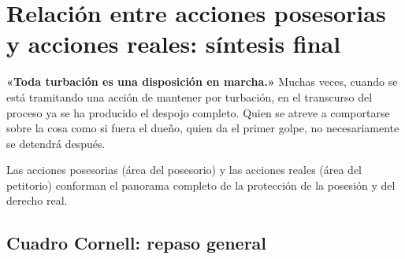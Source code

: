 \documentclass[12pt,oneside]{book}
\begin{document}
\chapter{Relación entre acciones posesorias y acciones reales: síntesis final}

\begin{important}
\textbf{«Toda turbación es una disposición en marcha.»} Muchas veces, cuando se está tramitando una acción de mantener por turbación, en el transcurso del proceso ya se ha producido el despojo completo. Quien se atreve a comportarse sobre la cosa como si fuera el dueño, quien da el primer golpe, no necesariamente se detendrá después.
\end{important}

Las acciones posesorias (área del posesorio) y las acciones reales (área del petitorio) conforman el panorama completo de la protección de la posesión y del derecho real.

\section*{Cuadro Cornell: repaso general}
\end{document}
